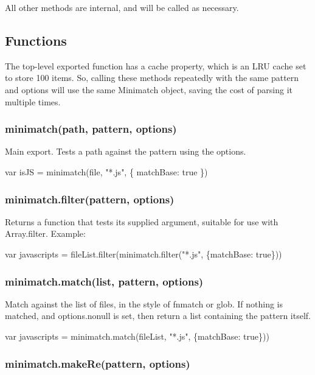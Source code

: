 All other methods are internal, and will be called as necessary.

\subsection*{Functions}

The top-\/level exported function has a {\ttfamily cache} property, which is an L\+RU cache set to store 100 items. So, calling these methods repeatedly with the same pattern and options will use the same Minimatch object, saving the cost of parsing it multiple times.

\subsubsection*{minimatch(path, pattern, options)}

Main export. Tests a path against the pattern using the options.


\begin{DoxyCode}
var isJS = minimatch(file, "*.js", \{ matchBase: true \})
\end{DoxyCode}


\subsubsection*{minimatch.\+filter(pattern, options)}

Returns a function that tests its supplied argument, suitable for use with {\ttfamily Array.\+filter}. Example\+:


\begin{DoxyCode}
var javascripts = fileList.filter(minimatch.filter("*.js", \{matchBase: true\}))
\end{DoxyCode}


\subsubsection*{minimatch.\+match(list, pattern, options)}

Match against the list of files, in the style of fnmatch or glob. If nothing is matched, and options.\+nonull is set, then return a list containing the pattern itself.


\begin{DoxyCode}
var javascripts = minimatch.match(fileList, "*.js", \{matchBase: true\}))
\end{DoxyCode}


\subsubsection*{minimatch.\+make\+Re(pattern, options)}

